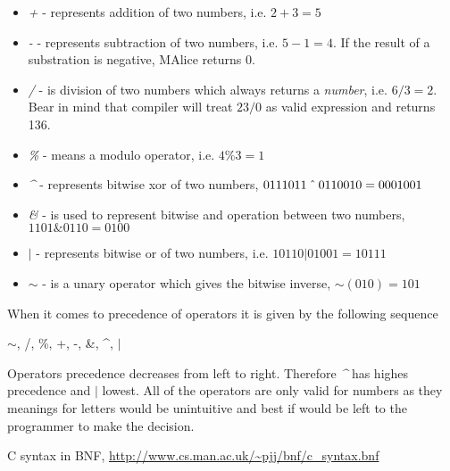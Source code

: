 \documentclass[a4wide, 11pt]{article}
\newcommand\xor{\mathbin{\char `\^}}
\begin{document}
\begin{itemize}

    \item
    \textit{+} - represents addition of two numbers, i.e. $ 2 + 3 = 5 $

    \item
    \textit{-} - represents subtraction of two numbers, i.e. $ 5 - 1 = 4 $. If the result of a substration is negative, MAlice returns 0.

    \item
    \textit{/} - is division of two numbers which always returns a \emph{number}, i.e. $ 6 / 3 = 2 $. Bear in mind that compiler will treat $ 23 / 0 $ as valid expression and returns 136.

    \item
    \textit{\%} - means a modulo operator, i.e. $ 4 \% 3 = 1 $

    \item
    \textit{\textasciicircum{}} - represents bitwise xor of two numbers, $ 0111011 \xor  0110010 = 0001001 $

    \item
    \textit{\&} - is used to represent bitwise and operation between two numbers,  $ 1101 \& 0110 = 0100 $

    \item
    \textit{$|$} - represents bitwise or of two numbers, i.e. $ 10110 | 01001 = 10111 $

    \item
    \textit{$\sim$} - is a unary operator which gives the bitwise inverse, $ \sim(010) = 101 $
    
\end{itemize}

When it comes to precedence of operators it is given by the following sequence

\begin{center} $\sim$, /, \%, +, -, \&, \textasciicircum{}, $|$ \end{center}

Operators precedence decreases from left to right. Therefore \emph{\textasciicircum{}} has highes precedence and \emph{$|$} lowest.
All of the operators are only valid for numbers as they meanings for letters would be unintuitive and best if would be left to the programmer to make the decision.


\begin{thebibliography}{9}

  C syntax in BNF,
  \url{http://www.cs.man.ac.uk/~pjj/bnf/c_syntax.bnf}

\end{thebibliography}
\end{document}
